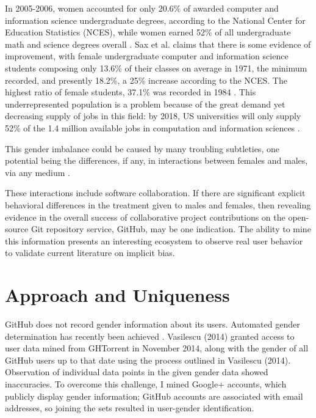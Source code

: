 \documentclass{sigplanconf}
\begin{document}
In 2005-2006, women accounted for only 20.6\% of awarded computer and information
science undergraduate degrees, according to the National Center for Education
Statistics (NCES), while women earned 52\% of all undergraduate
math and science degrees overall \citep{genderdiversitycomputing}.
Sax et al. claims that there is some evidence of improvement, with female
undergraduate computer and information science students composing only 13.6\% of
their classes on average in 1971, the minimum recorded, and presently 18.2\%, a
25\% increase according to the NCES. The highest ratio of female students,
37.1\% was recorded in 1984 \citep{evolutionofwomen}.
This underrepresented population is a problem because of the great demand yet
decreasing supply of jobs in this field: by 2018, US universities will only
supply 52\% of the 1.4 million available jobs in computation and information
sciences \citep{genderdiversitycomputing}.

This gender imbalance could be caused by many troubling subtleties,
one potential being the differences, if any, in interactions
between females and males, via any medium \citep{implicitbias}.

These interactions include software 
collaboration. If there are significant explicit behavioral differences in the
treatment given to males and females, then revealing evidence in the overall success of
collaborative project contributions on the open-source Git
repository service, GitHub, may be one indication. The ability to mine this information
presents an interesting ecosystem to observe real user behavior to validate current
literature on implicit bias.

\section{Approach and Uniqueness}

GitHub does not record gender information about its users. Automated gender
determination has recently been achieved \cite{VasilescuIWC13}.
Vasilescu (2014) granted access to user data mined from GHTorrent in November 2014,
along with the gender of all GitHub users up to that date using the process
outlined in Vasilescu (2014). Observation of individual data points in the given
gender data showed inaccuracies. To overcome this challenge, I mined Google+
accounts, which publicly display gender information; GitHub accounts are
associated with email addresses, so joining the sets resulted in user-gender
identification.
\end{document}
